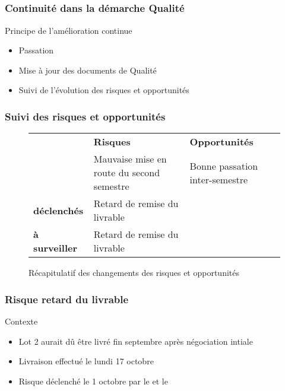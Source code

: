 
\speaker{\Kafui}

\subsection{} %


\begin{frame}
\frametitle{Continuité dans la démarche Qualité}
\begin{block}{Principe de l'amélioration continue}
\begin{itemize}
\item Passation 
\item Mise à jour des documents de Qualité
\item Suivi de l'évolution des risques et opportunités
\end{itemize}
\end{block}
\end{frame}




\begin{frame}
\frametitle{Suivi des risques et opportunités}
\begin{figure}
\begin{longtable}{|p{1.8cm}||p{3.5cm}|p{3.5cm}|}
\hline
 & \textbf{Risques} & \textbf{Opportunités} \\\hhline{|=||=|=|}
\multirow{1}{*}{\textbf{clôturés}} & \small Mauvaise mise en route du second semestre & \small Bonne passation inter-semestre \\\hline

\multirow{1}{*}{\textbf{déclenchés}} & \small Retard de remise du livrable & \\\hline
\multirow{1}{*}{\textbf{à surveiller}} & \small Retard de remise du livrable & \\\hline
\end{longtable}
\caption{Récapitulatif des changements des risques et opportunités}
\end{figure}
\end{frame}



\begin{frame}
\frametitle{Risque retard du livrable}
\begin{block}{Contexte}
\begin{itemize}
\item Lot 2 aurait dû être livré fin septembre après négociation intiale
\item Livraison effectué le lundi 17 octobre
\item Risque déclenché le 1 octobre par le \RQ{} et le \CP{}
\end{itemize}
\end{block}
\end{frame}

